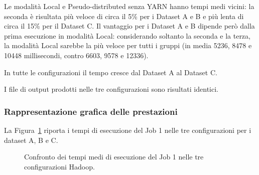 \documentclass[12pt, a4paper]{article}
\begin{document}
Le modalità Local e Pseudo-distributed senza YARN
hanno tempi medi vicini: la seconda è risultata più veloce
di circa il 5\% per i Dataset A e B e più lenta di circa
il 15\% per il Dataset C. Il vantaggio per i Dataset A e B
dipende però dalla prima esecuzione in modalità Local:
considerando soltanto la seconda e la terza, la modalità
Local sarebbe la più veloce per tutti i gruppi (in media
5236, 8478 e 10448 millisecondi, contro 6603, 9578 e 12336).

In tutte le configurazioni il tempo cresce
dal Dataset A al Dataset C.

I file di output prodotti nelle tre configurazioni
sono risultati identici.

\needspace{10cm}
\subsubsection{Rappresentazione grafica delle prestazioni}

La Figura~\ref{fig:job1tempi} riporta i tempi
di esecuzione del Job 1 nelle tre configurazioni
per i dataset A, B e C.

\begin{figure}[H]
\centering


\caption{Confronto dei tempi medi di esecuzione del Job 1 nelle tre configurazioni Hadoop.}
\label{fig:job1tempi}

\end{figure}
\end{document}
